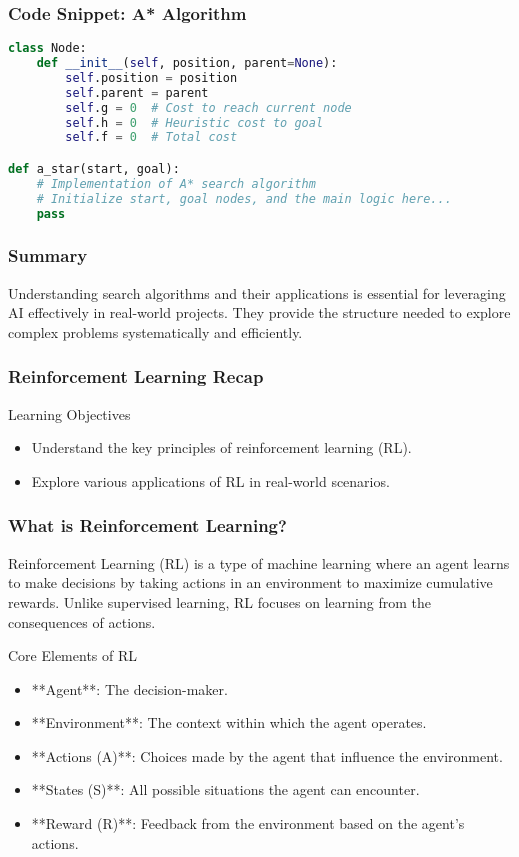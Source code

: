 \documentclass[aspectratio=169]{beamer}
\begin{document}
\begin{frame}[fragile]
    \frametitle{Code Snippet: A* Algorithm}
    \begin{lstlisting}[language=Python]
class Node:
    def __init__(self, position, parent=None):
        self.position = position
        self.parent = parent
        self.g = 0  # Cost to reach current node
        self.h = 0  # Heuristic cost to goal
        self.f = 0  # Total cost

def a_star(start, goal):
    # Implementation of A* search algorithm
    # Initialize start, goal nodes, and the main logic here...
    pass
    \end{lstlisting}
\end{frame}

\begin{frame}[fragile]
    \frametitle{Summary}
    Understanding search algorithms and their applications is essential for leveraging AI effectively in real-world projects. They provide the structure needed to explore complex problems systematically and efficiently.
\end{frame}

\begin{frame}[fragile]
    \frametitle{Reinforcement Learning Recap}
    \begin{block}{Learning Objectives}
        \begin{itemize}
            \item Understand the key principles of reinforcement learning (RL).
            \item Explore various applications of RL in real-world scenarios.
        \end{itemize}
    \end{block}
\end{frame}

\begin{frame}[fragile]
    \frametitle{What is Reinforcement Learning?}
    Reinforcement Learning (RL) is a type of machine learning where an agent learns to make decisions by taking actions in an environment to maximize cumulative rewards. Unlike supervised learning, RL focuses on learning from the consequences of actions.

    \begin{block}{Core Elements of RL}
        \begin{itemize}
            \item **Agent**: The decision-maker.
            \item **Environment**: The context within which the agent operates.
            \item **Actions (A)**: Choices made by the agent that influence the environment.
            \item **States (S)**: All possible situations the agent can encounter.
            \item **Reward (R)**: Feedback from the environment based on the agent's actions.
        \end{itemize}
    \end{block}
\end{frame}
\end{document}
